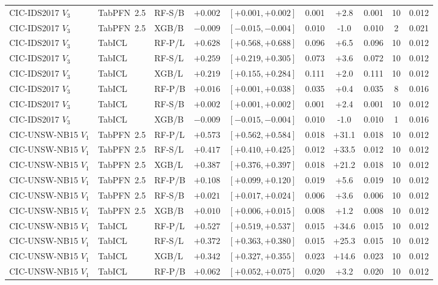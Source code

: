 \begin{tabular}{@{}lllrcccccc@{}}
CIC-IDS2017 $V_3$ & TabPFN~2.5 & RF-S/B & $+0.002$ & $[+0.001,+0.002]$ & 0.001 & +2.8 & 0.001 & 10 & 0.012 \\
CIC-IDS2017 $V_3$ & TabPFN~2.5 & XGB/B & $-0.009$ & $[-0.015,-0.004]$ & 0.010 & -1.0 & 0.010 & 2 & 0.021 \\
CIC-IDS2017 $V_3$ & TabICL & RF-P/L & $+0.628$ & $[+0.568,+0.688]$ & 0.096 & +6.5 & 0.096 & 10 & 0.012 \\
CIC-IDS2017 $V_3$ & TabICL & RF-S/L & $+0.259$ & $[+0.219,+0.305]$ & 0.073 & +3.6 & 0.072 & 10 & 0.012 \\
CIC-IDS2017 $V_3$ & TabICL & XGB/L & $+0.219$ & $[+0.155,+0.284]$ & 0.111 & +2.0 & 0.111 & 10 & 0.012 \\
CIC-IDS2017 $V_3$ & TabICL & RF-P/B & $+0.016$ & $[+0.001,+0.038]$ & 0.035 & +0.4 & 0.035 & 8 & 0.016 \\
CIC-IDS2017 $V_3$ & TabICL & RF-S/B & $+0.002$ & $[+0.001,+0.002]$ & 0.001 & +2.4 & 0.001 & 10 & 0.012 \\
CIC-IDS2017 $V_3$ & TabICL & XGB/B & $-0.009$ & $[-0.015,-0.004]$ & 0.010 & -1.0 & 0.010 & 1 & 0.016 \\
CIC-UNSW-NB15 $V_1$ & TabPFN~2.5 & RF-P/L & $+0.573$ & $[+0.562,+0.584]$ & 0.018 & +31.1 & 0.018 & 10 & 0.012 \\
CIC-UNSW-NB15 $V_1$ & TabPFN~2.5 & RF-S/L & $+0.417$ & $[+0.410,+0.425]$ & 0.012 & +33.5 & 0.012 & 10 & 0.012 \\
CIC-UNSW-NB15 $V_1$ & TabPFN~2.5 & XGB/L & $+0.387$ & $[+0.376,+0.397]$ & 0.018 & +21.2 & 0.018 & 10 & 0.012 \\
CIC-UNSW-NB15 $V_1$ & TabPFN~2.5 & RF-P/B & $+0.108$ & $[+0.099,+0.120]$ & 0.019 & +5.6 & 0.019 & 10 & 0.012 \\
CIC-UNSW-NB15 $V_1$ & TabPFN~2.5 & RF-S/B & $+0.021$ & $[+0.017,+0.024]$ & 0.006 & +3.6 & 0.006 & 10 & 0.012 \\
CIC-UNSW-NB15 $V_1$ & TabPFN~2.5 & XGB/B & $+0.010$ & $[+0.006,+0.015]$ & 0.008 & +1.2 & 0.008 & 10 & 0.012 \\
CIC-UNSW-NB15 $V_1$ & TabICL & RF-P/L & $+0.527$ & $[+0.519,+0.537]$ & 0.015 & +34.6 & 0.015 & 10 & 0.012 \\
CIC-UNSW-NB15 $V_1$ & TabICL & RF-S/L & $+0.372$ & $[+0.363,+0.380]$ & 0.015 & +25.3 & 0.015 & 10 & 0.012 \\
CIC-UNSW-NB15 $V_1$ & TabICL & XGB/L & $+0.342$ & $[+0.327,+0.355]$ & 0.023 & +14.6 & 0.023 & 10 & 0.012 \\
CIC-UNSW-NB15 $V_1$ & TabICL & RF-P/B & $+0.062$ & $[+0.052,+0.075]$ & 0.020 & +3.2 & 0.020 & 10 & 0.012 \\

\end{tabular}
